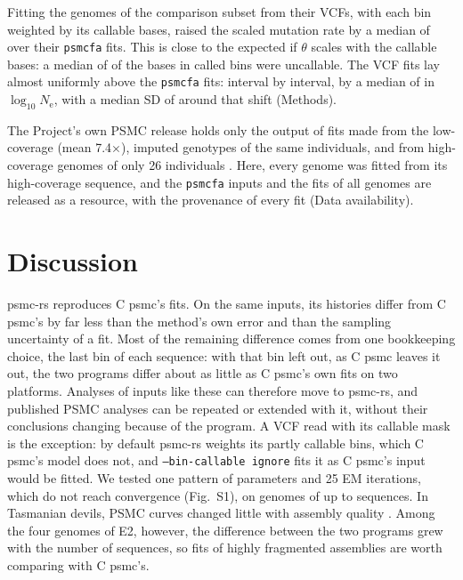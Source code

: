 \documentclass[11pt]{article}
\newcommand{\psmcrs}{psmc-rs}
\newcommand{\Ne}{\ensuremath{N_\mathrm{e}}}
\newcommand{\opt}[1]{\texttt{#1}}
\begin{document}
Fitting the \EsevenDefault{} genomes of the comparison subset from their VCFs, with each bin weighted by its callable bases, raised the scaled mutation rate by a median of \EsevenThetaShift{} over their \texttt{psmcfa} fits. This is close to the \EsevenThetaExpected{} expected if $\theta$ scales with the callable bases: a median of \EsevenMissingShare{} of the bases in called bins were uncallable. The VCF fits lay almost uniformly above the \texttt{psmcfa} fits: interval by interval, by a median of \EsevenRouteShiftMedian{} in $\log_{10}\Ne$, with a median SD of \EsevenRouteShapeMedian{} around that shift (Methods).

The Project's own PSMC release holds only the output of fits made from the low-coverage (mean 7.4$\times$), imputed genotypes of the same individuals, and from high-coverage genomes of only 26 individuals \citep{kgp2015,kgpPsmc}. Here, every genome was fitted from its high-coverage sequence, and the \texttt{psmcfa} inputs and the fits of all \EsevenGenomes{} genomes are released as a resource, with the provenance of every fit (Data availability).

\section*{Discussion}

\psmcrs{} reproduces C psmc's fits. On the same inputs, its histories differ from C psmc's by far less than the method's own error and than the sampling uncertainty of a fit. Most of the remaining difference comes from one bookkeeping choice, the last bin of each sequence: with that bin left out, as C psmc leaves it out, the two programs differ about as little as C psmc's own fits on two platforms. Analyses of inputs like these can therefore move to \psmcrs{}, and published PSMC analyses can be repeated or extended with it, without their conclusions changing because of the program. A VCF read with its callable mask is the exception: by default \psmcrs{} weights its partly callable bins, which C psmc's model does not, and \opt{--bin-callable ignore} fits it as C psmc's input would be fitted. We tested one pattern of parameters and 25 EM iterations, which do not reach convergence (Fig.~S1), on genomes of up to \EtwoTurtleSeqMax{} sequences. In Tasmanian devils, PSMC curves changed little with assembly quality \citep{patton2019}. Among the four genomes of E2, however, the difference between the two programs grew with the number of sequences, so fits of highly fragmented assemblies are worth comparing with C psmc's.
\end{document}
